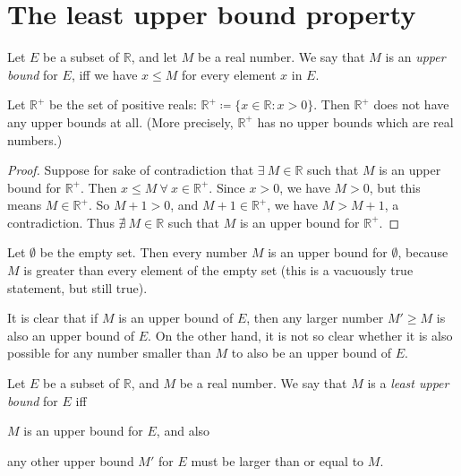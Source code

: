 \section{The least upper bound property}\label{sec 5.5}

\begin{definition}\label{5.5.1}
Let \(E\) be a subset of \(\mathds{R}\), and let \(M\) be a real number.
We say that \(M\) is an \emph{upper bound} for \(E\), iff we have \(x \leq M\) for every element \(x\) in \(E\).
\end{definition}

\begin{additional corollary}\label{ac 5.5.1}
Let \(\mathds{R}^+\) be the set of positive reals: \(\mathds{R}^+ \coloneqq \{x \in \mathds{R} : x > 0\}\).
Then \(\mathds{R}^+\) does not have any upper bounds at all.
(More precisely, \(\mathds{R}^+\) has no upper bounds which are real numbers.)
\end{additional corollary}

\begin{proof}
Suppose for sake of contradiction that \(\exists\ M \in \mathds{R}\) such that \(M\) is an upper bound for \(\mathds{R}^+\).
Then \(x \leq M \ \forall\ x \in \mathds{R}^+\).
Since \(x > 0\), we have \(M > 0\), but this means \(M \in \mathds{R}^+\).
So \(M + 1 > 0\), and \(M + 1 \in \mathds{R}^+\), we have \(M > M + 1\), a contradiction.
Thus \(\nexists\ M \in \mathds{R}\) such that \(M\) is an upper bound for \(\mathds{R}^+\).
\end{proof}

\setcounter{theorem}{3}
\begin{example}\label{5.5.4}
Let \(\emptyset\) be the empty set.
Then every number \(M\) is an upper bound for \(\emptyset\), because \(M\) is greater than every element of the empty set
(this is a vacuously true statement, but still true).
\end{example}

\begin{note}
It is clear that if \(M\) is an upper bound of \(E\), then any larger number \(M' \geq M\) is also an upper bound of \(E\).
On the other hand, it is not so clear whether it is also possible for any number smaller than \(M\) to also be an upper bound of \(E\).
\end{note}

\begin{definition}\label{5.5.5}
Let \(E\) be a subset of \(\mathds{R}\), and \(M\) be a real number.
We say that \(M\) is a \emph{least upper bound} for \(E\) iff
\begin{enumerate*}
    \item \(M\) is an upper bound for \(E\), and also
    \item any other upper bound \(M'\) for \(E\) must be larger than or equal to \(M\).
\end{enumerate*}
\end{definition}

